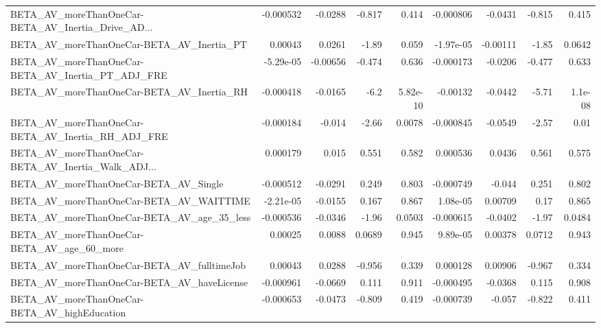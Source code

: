 \begin{tabular}{lrrrrrrrr}
BETA\_AV\_moreThanOneCar-BETA\_AV\_Inertia\_Drive\_AD... &   -0.000532 &      -0.0288 &   -0.817 &    0.414 &  -0.000806 &     -0.0431 &       -0.815 &         0.415 \\
BETA\_AV\_moreThanOneCar-BETA\_AV\_Inertia\_PT          &     0.00043 &       0.0261 &    -1.89 &    0.059 &  -1.97e-05 &    -0.00111 &        -1.85 &        0.0642 \\
BETA\_AV\_moreThanOneCar-BETA\_AV\_Inertia\_PT\_ADJ\_FRE  &   -5.29e-05 &     -0.00656 &   -0.474 &    0.636 &  -0.000173 &     -0.0206 &       -0.477 &         0.633 \\
BETA\_AV\_moreThanOneCar-BETA\_AV\_Inertia\_RH          &   -0.000418 &      -0.0165 &     -6.2 & 5.82e-10 &   -0.00132 &     -0.0442 &        -5.71 &       1.1e-08 \\
BETA\_AV\_moreThanOneCar-BETA\_AV\_Inertia\_RH\_ADJ\_FRE  &   -0.000184 &       -0.014 &    -2.66 &   0.0078 &  -0.000845 &     -0.0549 &        -2.57 &          0.01 \\
BETA\_AV\_moreThanOneCar-BETA\_AV\_Inertia\_Walk\_ADJ... &    0.000179 &        0.015 &    0.551 &    0.582 &   0.000536 &      0.0436 &        0.561 &         0.575 \\
BETA\_AV\_moreThanOneCar-BETA\_AV\_Single              &   -0.000512 &      -0.0291 &    0.249 &    0.803 &  -0.000749 &      -0.044 &        0.251 &         0.802 \\
BETA\_AV\_moreThanOneCar-BETA\_AV\_WAITTIME            &   -2.21e-05 &      -0.0155 &    0.167 &    0.867 &   1.08e-05 &     0.00709 &         0.17 &         0.865 \\
BETA\_AV\_moreThanOneCar-BETA\_AV\_age\_35\_less         &   -0.000536 &      -0.0346 &    -1.96 &   0.0503 &  -0.000615 &     -0.0402 &        -1.97 &        0.0484 \\
BETA\_AV\_moreThanOneCar-BETA\_AV\_age\_60\_more         &     0.00025 &       0.0088 &   0.0689 &    0.945 &   9.89e-05 &     0.00378 &       0.0712 &         0.943 \\
BETA\_AV\_moreThanOneCar-BETA\_AV\_fulltimeJob         &     0.00043 &       0.0288 &   -0.956 &    0.339 &   0.000128 &     0.00906 &       -0.967 &         0.334 \\
BETA\_AV\_moreThanOneCar-BETA\_AV\_haveLicense         &   -0.000961 &      -0.0669 &    0.111 &    0.911 &  -0.000495 &     -0.0368 &        0.115 &         0.908 \\
BETA\_AV\_moreThanOneCar-BETA\_AV\_highEducation       &   -0.000653 &      -0.0473 &   -0.809 &    0.419 &  -0.000739 &      -0.057 &       -0.822 &         0.411 \\

\end{tabular}
